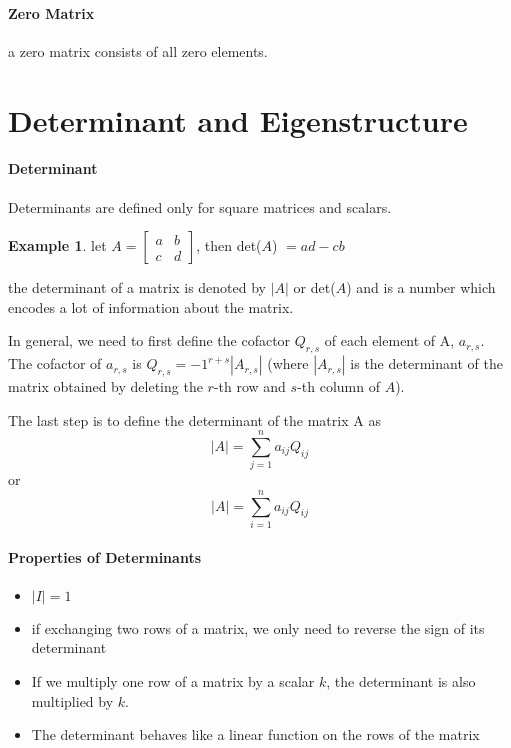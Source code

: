\documentclass{article}
\theoremstyle{definition}
\newtheorem{example}[theorem]{Example}
\theoremstyle{remark}
\begin{document}
\paragraph{Zero Matrix}
a zero matrix consists of all zero elements.

\section{Determinant and Eigenstructure}

\paragraph{Determinant}
Determinants are defined only for square matrices and scalars.

\begin{example}

    let $A = \begin{bmatrix}
        a & b \\
        c & d
    \end{bmatrix}$, then 
    det($A$) $ = ad - cb$
\end{example}

the determinant of a matrix is denoted by $|A|$ or det($A$) and is a number which encodes a lot of information about the matrix.

In general, we need to first define the cofactor $Q_{r,s}$ of each element of A, $a_{r,s}$. The cofactor of $a_{r,s}$ is $Q_{r,s} = -1^{r+s} |A_{r,s}|$ (where $|A_{r,s}|$ is the determinant of the matrix obtained by deleting the $r$-th row and $s$-th column of $A$).

The last step is to define the determinant of the matrix A as $$|A| = \sum_{j=1}^{n}a_{ij}Q_{ij}$$ or $$|A| = \sum_{i=1}^na_{ij}Q_{ij}$$

\paragraph{Properties of Determinants}

\begin{itemize}
    \item $|I| = 1$
    \item if exchanging two rows of a matrix, we only need to reverse the sign of its determinant
    \item If we multiply one row of a matrix by a scalar $k$, the determinant is also multiplied by $k$. 
    \item The determinant behaves like a linear function on the rows of the matrix  
\end{itemize}
\end{document}

